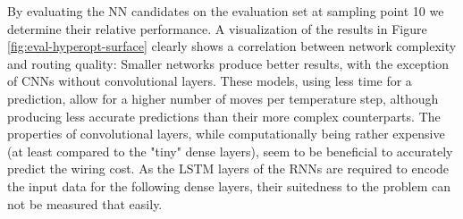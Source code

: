 By evaluating the \gls{NN} candidates on the evaluation set at sampling point 10 we determine their relative performance. A visualization of the results in Figure \ref{fig:eval-hyperopt-surface} clearly shows a correlation between network complexity and routing quality: Smaller networks produce better results, with the exception of \glspl{CNN} without convolutional layers. These models, using less time for a prediction, allow for a higher number of moves per temperature step, although producing less accurate predictions than their more complex counterparts. The properties of convolutional layers, while computationally being rather expensive (at least compared to the "tiny" dense layers), seem to be beneficial to accurately predict the wiring cost. As the \gls{LSTM} layers of the \glspl{RNN} are required to encode the input data for the following dense layers, their suitedness to the problem can not be measured that easily.

\begin{table}
	\caption{Results of \gls{CNN} HPO. Median of reached scores for each model variant.}
	\label{table:cnn-hyperopt-results}
\end{table}

